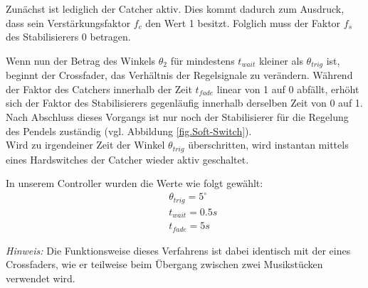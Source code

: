 Zunächst ist lediglich der Catcher aktiv. Dies kommt dadurch zum Ausdruck, dass sein Verstärkungsfaktor $f_c$ den Wert 1 besitzt. Folglich muss der Faktor $f_s$ des Stabilisierers 0 betragen.

Wenn nun der Betrag des Winkels $\theta_2$ für mindestens $t_{wait}$ kleiner als $\theta_{trig}$ ist, beginnt der Crossfader, das Verhältnis der Regelsignale zu verändern.
Während der Faktor des Catchers innerhalb der Zeit $t_{fade}$ linear von 1 auf 0 abfällt, erhöht sich der Faktor des Stabilisierers gegenläufig innerhalb derselben Zeit von 0 auf 1.
Nach Abschluss dieses Vorgangs ist nur noch der Stabilisierer für die Regelung des Pendels zuständig (vgl. Abbildung \ref{fig.Soft-Switch}). \\

Wird zu irgendeiner Zeit der Winkel $\theta_{trig}$ überschritten, wird instantan mittels eines Hardswitches der Catcher wieder aktiv geschaltet.

In unserem Controller wurden die Werte wie folgt gewählt:
\begin{eqnarray*}
&& \theta_{trig} = 5^{\circ} \\
&& t_{wait} = 0.5 s \\
&& t_{fade} = 5 s
\end{eqnarray*}


\textit{Hinweis:} Die Funktionsweise dieses Verfahrens ist dabei identisch mit der eines Crossfaders, wie er teilweise beim Übergang zwischen zwei Musikstücken verwendet wird.
